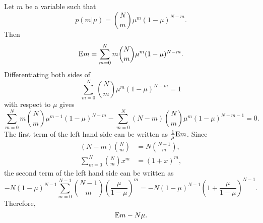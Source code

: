 \subsection{}
\label{2.4}
Let $m$ be a variable such that
%
\begin{equation}
p(m | \mu) = {N \choose m} \mu ^ m (1 - \mu) ^ {N - m}.
\end{equation}
%
Then
%
\begin{equation}
{\rm E} m = \sum_{m = 0}^{N} m {N \choose m} \mu ^ m (1 - \mu) ^ {N - m}.
\end{equation}
%
Differentiating both sides of 
%
\begin{equation}
\sum_{m = 0}^{N} {N \choose m} \mu ^ m (1 - \mu) ^ {N - m}  = 1
\end{equation}
%
with respect to $\mu$ gives
%
\begin{equation}
\sum_{m = 0}^{N} m {N \choose m} \mu ^ {m - 1} (1 - \mu) ^ {N - m} - \sum_{m = 0}^{N} (N - m) {N \choose m} \mu ^ m (1 - \mu) ^ {N - m - 1} = 0.
\end{equation}
%
The first term of the left hand side can be written as $\frac{1}{\mu} {\rm E} m$.
Since
%
\begin{equation}
\begin{aligned}
(N - m) {N \choose m} &= N {N - 1 \choose m}, \\
\sum_{m = 0}^{N} {N \choose m} x ^ m &= (1 + x) ^ m,
\end{aligned}
\end{equation}
%
the second term of the left hand side can be written as
%
\begin{equation}
- N (1 - \mu) ^ {N - 1} \sum_{m = 0}^{N - 1} {N - 1 \choose m} \left( \frac{\mu}{1 - \mu} \right) ^ m = - N (1 - \mu) ^ {N - 1} \left( 1 + \frac{\mu}{1 - \mu} \right) ^ {N - 1}.
\end{equation}
%
Therefore,
%
\begin{equation}
{\rm E} m - N \mu. 
\end{equation}
%

